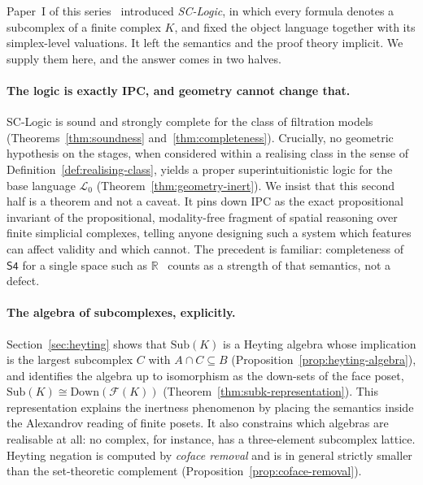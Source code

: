 \documentclass[final,12pt]{elsarticle}
\theoremstyle{plain}
\theoremstyle{definition}
\begin{document}
Paper~I of this series~\cite{scgeometry1} introduced \emph{SC-Logic}, in which
every formula denotes a subcomplex of a finite complex $K$, and fixed the
object language together with its simplex-level valuations. It left the
semantics and the proof theory implicit. We supply them here, and the answer
comes in two halves.

\paragraph{The logic is exactly IPC, and geometry cannot change that.}
SC-Logic is sound and strongly complete for the class of filtration models
(Theorems~\ref{thm:soundness} and~\ref{thm:completeness}). Crucially, no
 geometric hypothesis on the stages, when considered within a realising class
 in the sense of Definition~\ref{def:realising-class}, yields a proper
 superintuitionistic logic for the base language $\mathcal{L}_0$
 (Theorem~\ref{thm:geometry-inert}).
We insist that this second half is a theorem and not a caveat. It pins down
IPC as the exact propositional invariant of the propositional, modality-free fragment of spatial reasoning over finite simplicial complexes,
telling anyone designing such a system which features can affect validity and
which cannot. The precedent is familiar: completeness of $\mathsf{S4}$ for a
single space such as $\mathbb{R}$~\cite{mckinseytarski1944} counts as a
strength of that semantics, not a defect.

\paragraph{The algebra of subcomplexes, explicitly.}
Section~\ref{sec:heyting} shows that $\mathrm{Sub}(K)$ is a Heyting algebra
whose implication is the largest subcomplex $C$ with $A \cap C \subseteq B$
(Proposition~\ref{prop:heyting-algebra}), and identifies the algebra up to
isomorphism as the down-sets of the face poset,
$\mathrm{Sub}(K) \cong \mathrm{Down}(\mathcal{F}(K))$
(Theorem~\ref{thm:subk-representation}). This representation explains the
inertness phenomenon by placing the semantics inside the Alexandrov reading of
finite posets. It also constrains which algebras are realisable at all: no
complex, for instance, has a three-element subcomplex lattice. Heyting
negation is computed by \emph{coface removal} and is in general strictly
smaller than the set-theoretic complement (Proposition~\ref{prop:coface-removal}).
\end{document}
